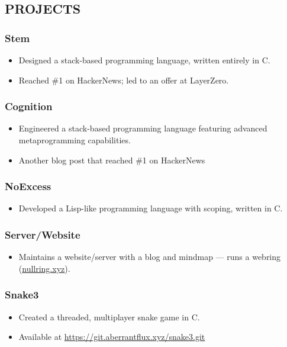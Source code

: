 \documentclass[10pt,letterpaper]{article}
\begin{document}
\begin{minipage}[t]{0.47\textwidth}
\subsection*{PROJECTS}
\label{sec:org9cd42b8}
\subsubsection*{Stem}
\label{sec:orgef7a6a4}
\begin{itemize}
\item Designed a stack-based programming language, written entirely in C.
\item Reached \#1 on HackerNews; led to an offer at LayerZero.
\end{itemize}
\subsubsection*{Cognition}
\label{sec:orga262a78}
\begin{itemize}
\item Engineered a stack-based programming language featuring advanced metaprogramming capabilities.
\item Another blog post that reached \#1 on HackerNews
\end{itemize}
\subsubsection*{NoExcess}
\label{sec:org6fefc71}
\begin{itemize}
\item Developed a Lisp-like programming language with scoping, written in C.
\end{itemize}
\subsubsection*{Server/Website}
\label{sec:org73f6fd4}
\begin{itemize}
\item Maintains a website/server with a blog and mindmap — runs a webring (\href{https://nullring.xyz}{nullring.xyz}).
\end{itemize}
\subsubsection*{Snake3}
\label{sec:orgb89d92d}
\begin{itemize}
\item Created a threaded, multiplayer snake game in C.
\item Available at \href{https://git.aberrantflux.xyz/snake3.git}{https://git.aberrantflux.xyz/snake3.git}
\end{itemize}

\end{minipage}
\end{document}
